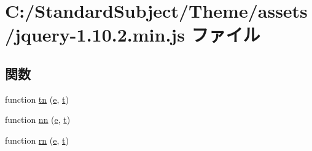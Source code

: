 \hypertarget{jquery-1_810_82_8min_8js}{}\section{C\+:/\+Standard\+Subject/\+Theme/assets/jquery-\/1.10.2.min.\+js ファイル}
\label{jquery-1_810_82_8min_8js}
\subsection*{関数}
\begin{DoxyCompactItemize}
\item 
function \hyperlink{jquery-1_810_82_8min_8js_a9372ffea5788fa8dc44b8fc18aba3118}{tn} (\hyperlink{jribbble_8js_a2c038346d47955cbe2cb91e338edd7e1}{e}, \hyperlink{jribbble_8js_a5459dd59c2ac7c323d9ca8bca22ff249}{t})
\item 
function \hyperlink{jquery-1_810_82_8min_8js_a11655b827ec323fed5b6a764f93b9ece}{nn} (\hyperlink{jribbble_8js_a2c038346d47955cbe2cb91e338edd7e1}{e}, \hyperlink{jribbble_8js_a5459dd59c2ac7c323d9ca8bca22ff249}{t})
\item 
function \hyperlink{jquery-1_810_82_8min_8js_a683a60c6ff4ff96a79f34e54fc8cc972}{rn} (\hyperlink{jribbble_8js_a2c038346d47955cbe2cb91e338edd7e1}{e}, \hyperlink{jribbble_8js_a5459dd59c2ac7c323d9ca8bca22ff249}{t})
\item 

\end{DoxyCompactItemize}
